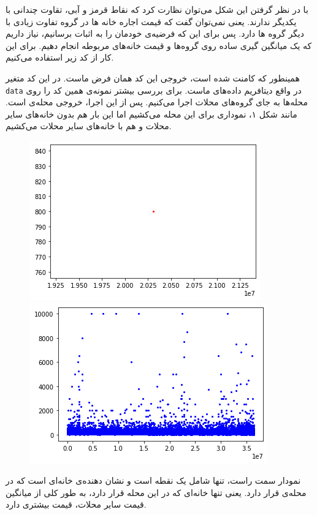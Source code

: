 \documentclass[table]{article}
\begin{document}
	با در نظر گرفتن این شکل می‌توان نظارت کرد که نقاط قرمز و آبی، تقاوت چندانی با یکدیگر ندارند. یعنی نمی‌توان گفت که قیمت اجاره خانه ها در گروه  تفاوت زیادی با دیگر گروه ها دارد. پس برای این که فرضیه‌ی خودمان را به اثبات برسانیم، نیاز داریم که یک میانگین گیری ساده روی گروه‌ها و قیمت خانه‌های مربوطه انجام دهیم. برای این کار از کد زیر استفاده می‌کنیم.
	\begin{LTR}
		
	\end{LTR}
	همینطور که کامنت شده است، خروجی این کد همان فرض ماست. در این کد متغیر
	\verb*|data|
	در واقع دیتافریم داده‌های ماست.
	برای بررسی بیشتر نمونه‌ی همین کد را روی محله‌ها به جای گروه‌های محلات اجرا می‌کنیم. پس از این اجرا، خروجی محله‌ی  است. مانند شکل ۱، نموداری برای این محله می‌کشیم اما این بار هم بدون خانه‌های سایر محلات و هم با خانه‌های سایر محلات می‌کشیم.
	\begin{figure}[h!]
		\centering
		\includegraphics[scale=.5]{./graph2.png}
		\includegraphics[scale=.5]{./graph3.png}
		\caption{}
	\end{figure}
	نمودار سمت راست، تنها شامل یک نقطه است و نشان دهنده‌ی خانه‌ای است که در محله‌ی   قرار دارد. یعنی تنها‌ خانه‌ای که در این محله‌ قرار دارد، به طور کلی از میانگین قیمت سایر محلات، قیمت بیشتری دارد.
	
\end{document}
